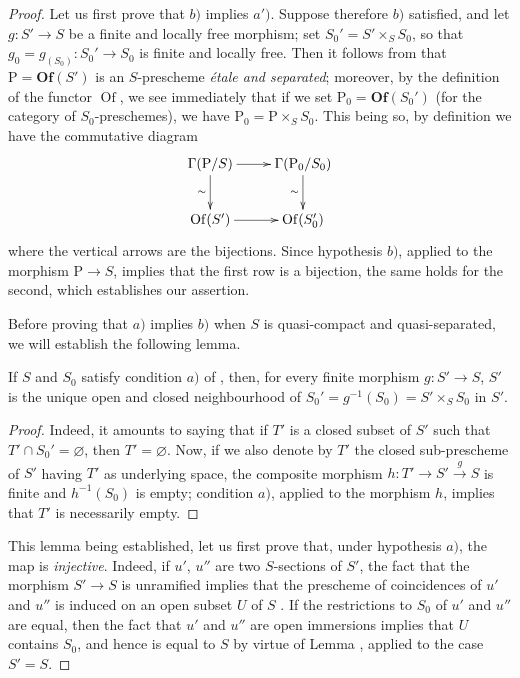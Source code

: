\begin{proof}
Let us first prove that $b)$ implies $a')$.
Suppose therefore $b)$ satisfied, and let $g:S'\to S$ be a finite and locally free morphism;
set $S_0'=S'\times_S S_0$, so that $g_0=g_{(S_0)}:S_0'\to S_0$ is finite and locally free.
Then it follows from  that $\mathrm{P}=\mathbf{Of}(S')$ is an $S$-prescheme \emph{\'etale and separated};
moreover, by the definition of the functor $\operatorname{Of}$, we see immediately that if we set $\mathrm{P}_0=\mathbf{Of}(S_0')$ (for the category of $S_0$-preschemes), we have $\mathrm{P}_0=\mathrm{P}\times_S S_0$.
This being so, by definition we have the commutative diagram
\[
\xymatrix{
\Gamma(\mathrm{P}/S)\ar[r]\ar[d]_{\sim} & \Gamma(\mathrm{P}_0/S_0)\ar[d]_{\sim}\\
\operatorname{Of}(S')\ar[r] & \operatorname{Of}(S_0')
}
\]
where the vertical arrows are the bijections.
Since hypothesis $b)$, applied to the morphism $\mathrm{P}\to S$, implies that the first row is a bijection, the same holds for the second, which establishes our assertion.

Before proving that $a)$ implies $b)$ when $S$ is quasi-compact and quasi-separated, we will establish the following lemma.

\begin{lemma}[18.5.4.3]
\label{IV.18.5.4.3}
If $S$ and $S_0$ satisfy condition $a)$ of , then, for every finite morphism $g:S'\to S$, $S'$ is the unique open and closed neighbourhood of $S_0'=g^{-1}(S_0)=S'\times_S S_0$ in $S'$.
\end{lemma}

\begin{proof}
Indeed, it amounts to saying that if $T'$ is a closed subset of $S'$ such that $T'\cap S_0'=\varnothing$, then $T'=\varnothing$.
Now, if we also denote by $T'$ the closed sub-prescheme of $S'$ having $T'$ as underlying space, the composite morphism $h:T'\to S'\xrightarrow{g}S$ is finite and $h^{-1}(S_0)$ is empty;
condition $a)$, applied to the morphism $h$, implies that $T'$ is necessarily empty.
\end{proof}

This lemma being established, let us first prove that, under hypothesis $a)$, the map  is \emph{injective}.
Indeed, if $u'$, $u''$ are two $S$-sections of $S'$, the fact that the morphism $S'\to S$ is unramified implies that the prescheme of coincidences of $u'$ and $u''$ is induced on an open subset $U$ of $S$ .
If the restrictions to $S_0$ of $u'$ and $u''$ are equal, then the fact that $u'$ and $u''$ are open immersions  implies that $U$ contains $S_0$, and hence is equal to $S$ by virtue of Lemma , applied to the case $S'=S$.


\end{proof}
